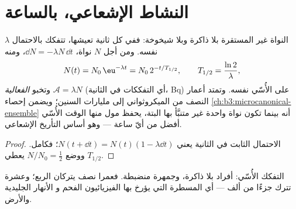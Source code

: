 \section{النشاط الإشعاعي، بالساعة}

\begin{theorem}\label{thm:b3:nuclear-physics:decay}
النواة غير المستقرة بلا ذاكرة وبلا شيخوخة: ففي كل ثانية
تعيشها، تتفكك بالاحتمال $\lambda$ نفسه. ومن أجل $N$
نواة، $\dd N = -\lambda N\,\dd t$، ومنه
\[
N(t) = N_0\,\eu^{-\lambda t} = N_0\,2^{-t/T_{1/2}} ,
\qquad T_{1/2} = \frac{\ln2}{\lambda} ,
\]
وتخبو \emph{الفعالية} $\mathcal A = \lambda N$ (أي التفككات في
الثانية، \unit{Bq}) على الأُسّي نفسه. وتمتد أعمار النصف
من الميكروثواني إلى مليارات السنين؛ ويضمن إحصاء
\cref{ch:b3:microcanonical-ensemble} أنه بينما تكون نواة
واحدة غير متنبَّأ بها البتة، يحفظ مول منها
الوقت الأُسّي أفضل من أيّ ساعة --- وهو أساس
التأريخ الإشعاعي.
\end{theorem}

\begin{proof}
الاحتمال الثابت في الثانية يعني $N(t + \dd t) = N(t)(1 -
\lambda\dd t)$؛ فكامل. ووضع $N/N_0 = \tfrac12$ يعطي
$T_{1/2}$.
\end{proof}

\begin{omfigure}

{\small التفكك الأُسّي: أفراد بلا ذاكرة، وجمهرة
منضبطة. فعمرا نصف يتركان الربع؛ وعشرة تترك
جزءًا من ألف --- أي المسطرة التي يؤرخ بها الفيزيائيون الفحم و
الأنهار الجليدية والأرض.}
\end{omfigure}

